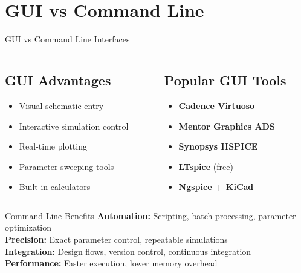 \documentclass{beamer}
\begin{document}
\section{GUI vs Command Line}

\begin{frame}{GUI vs Command Line Interfaces}
    \begin{columns}
        \begin{column}{0.5\textwidth}
            \subsection{GUI Advantages}
            \begin{itemize}
                \item Visual schematic entry
                \item Interactive simulation control
                \item Real-time plotting
                \item Parameter sweeping tools
                \item Built-in calculators
            \end{itemize}
        \end{column}
        \begin{column}{0.5\textwidth}
            \subsection{Popular GUI Tools}
            \begin{itemize}
                \item \textbf{Cadence Virtuoso}
                \item \textbf{Mentor Graphics ADS}
                \item \textbf{Synopsys HSPICE}
                \item \textbf{LTspice} (free)
                \item \textbf{Ngspice + KiCad}
            \end{itemize}
        \end{column}
    \end{columns}
    
    \begin{alertblock}{Command Line Benefits}
        \textbf{Automation:} Scripting, batch processing, parameter optimization \\
        \textbf{Precision:} Exact parameter control, repeatable simulations \\
        \textbf{Integration:} Design flows, version control, continuous integration \\
        \textbf{Performance:} Faster execution, lower memory overhead
    \end{alertblock}
\end{frame}
\end{document}
